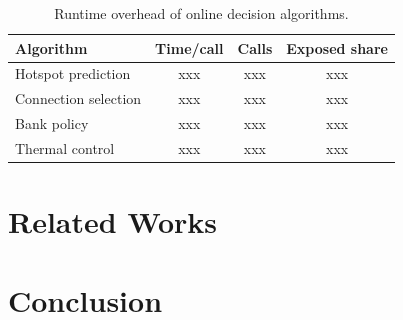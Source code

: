 \documentclass[conference,10pt]{IEEEtran}
\begin{document}
\begin{table}[t]
\caption{Runtime overhead of online decision algorithms.}
\label{tab:eval-runtime}
\centering\small
\begin{tabular}{@{}lccc@{}}
\hline
Algorithm & Time/call & Calls & Exposed share \\
\hline
Hotspot prediction & xxx & xxx & xxx \\
Connection selection & xxx & xxx & xxx \\
Bank policy & xxx & xxx & xxx \\
Thermal control & xxx & xxx & xxx \\
\hline
\end{tabular}
\end{table}

\section{Related Works}
\label{sec:related-works}

\section{Conclusion}
\label{sec:conclusion}



\end{document}
